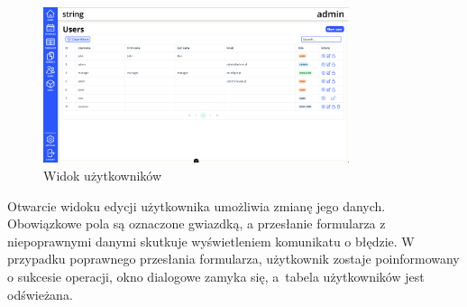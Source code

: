 \begin{figure}[H]
    \centering
    \includegraphics[width=0.8\textwidth, frame]{graf/front/users.png}
    \caption{Widok użytkowników}
    \label{fig:usersView}
\end{figure}

Otwarcie widoku edycji użytkownika umożliwia zmianę jego danych. Obowiązkowe pola są oznaczone gwiazdką, a przesłanie formularza z niepoprawnymi danymi skutkuje wyświetleniem komunikatu o błędzie. W przypadku poprawnego przesłania formularza, użytkownik zostaje poinformowany o sukcesie operacji, okno dialogowe zamyka się, a~tabela użytkowników jest odświeżana.

